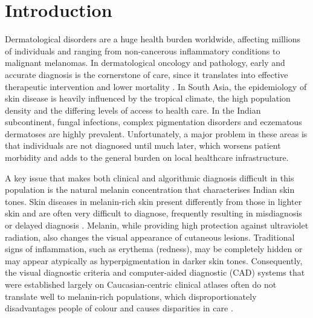 \documentclass[pdflatex,sn-mathphys-num]{sn-jnl}%
\begin{document}
\maketitle

\section{Introduction}\label{sec:intro}

Dermatological disorders are a huge health burden worldwide, affecting millions of
individuals and ranging from non-cancerous inflammatory conditions to malignant melanomas.
In dermatological oncology and pathology, early and accurate diagnosis is the cornerstone
of care, since it translates into effective therapeutic intervention and lower mortality
\cite{ref1}. In South Asia, the epidemiology of skin disease is heavily influenced by the
tropical climate, the high population density and the differing levels of access to health
care. In the Indian subcontinent, fungal infections, complex pigmentation disorders and
eczematous dermatoses are highly prevalent. Unfortunately, a major problem in these areas
is that individuals are not diagnosed until much later, which worsens patient morbidity and
adds to the general burden on local healthcare infrastructure.

A key issue that makes both clinical and algorithmic diagnosis difficult in this population
is the natural melanin concentration that characterises Indian skin tones. Skin diseases in
melanin-rich skin present differently from those in lighter skin and are often very
difficult to diagnose, frequently resulting in misdiagnosis or delayed diagnosis
\cite{ref10}. Melanin, while providing high protection against ultraviolet radiation, also
changes the visual appearance of cutaneous lesions. Traditional signs of inflammation, such
as erythema (redness), may be completely hidden or may appear atypically as
hyperpigmentation in darker skin tones. Consequently, the visual diagnostic criteria and
computer-aided diagnostic (CAD) systems that were established largely on Caucasian-centric
clinical atlases often do not translate well to melanin-rich populations, which
disproportionately disadvantages people of colour and causes disparities in care
\cite{ref6}.
\end{document}
